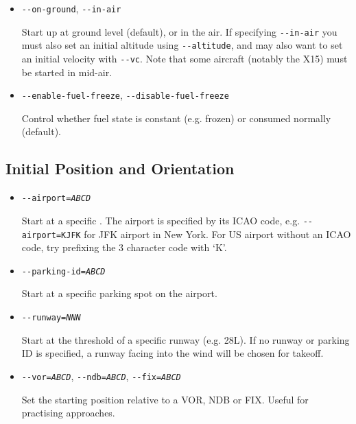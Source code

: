 {\begin{itemize}
Trim (or not) when initializing JSBSim. Defaults to trim.

\item{\texttt{-$ $-on-ground}, \texttt{-$ $-in-air}}

Start up at ground level (default), or in the air. If specifying \texttt{-$ $-in-air} you
must also set an initial altitude using \texttt{-$ $-altitude}, and may also want to set
an initial velocity with \texttt{-$ $-vc}. Note that some aircraft (notably the X15) must
be started in mid-air.

\item{\texttt{-$ $-enable-fuel-freeze}, \texttt{-$ $-disable-fuel-freeze}}

Control whether fuel state is constant (e.g. frozen) or consumed normally (default).

\end{itemize}

\subsection{Initial Position and Orientation\label{aiportid}}
\begin{itemize}
\item{\texttt{-$ $-airport={\it ABCD}}}

Start at a specific . The airport is specified by its ICAO code, e.g. \texttt{-$ $-airport=KJFK} for
JFK airport in New York. For US airport without an ICAO code, try prefixing the 3 character code
with `K'.

\item{\texttt{-$ $-parking-id={\it ABCD}}}

Start at a specific parking spot on the airport.

\item{\texttt{-$ $-runway={\it NNN}}}

Start at the threshold of a specific runway (e.g. 28L). If no runway or parking ID is
specified, a runway facing into the wind will be chosen for takeoff.

\item{\texttt{-$ $-vor={\it ABCD}}, \texttt{-$ $-ndb={\it ABCD}}, \texttt{-$ $-fix={\it ABCD}}}

Set the starting position relative to a VOR, NDB or FIX. Useful for practising approaches.


\end{itemize}}
